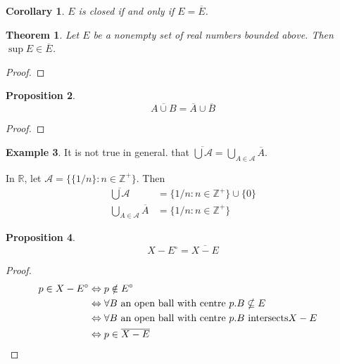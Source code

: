 \documentclass{book}
\let\qed\relax
\newtheorem{prop}{Proposition}[chapter]
\newtheorem{cor}{Corollary}[prop]
\newtheorem{thm}[prop]{Theorem}
\theoremstyle{definition}
\newtheorem{ex}[prop]{Example}
\begin{document}
\begin{cor}
$E$ is closed if and only if $E = \overline{E}$.
\end{cor}

\begin{thm}
Let $E$ be a nonempty set of real numbers bounded above. Then $\sup E \in \overline{E}$.
\end{thm}

\begin{proof}
\pf
{}
\qed
\end{proof}

\begin{prop}
\[ \overline{A \cup B} = \overline{A} \cup \overline{B} \]
\end{prop}

\begin{proof}
\pf
{}
\qed
\end{proof}

\begin{ex}
It is not true in general. that $\overline{\bigcup \mathcal{A}} = \bigcup_{A \in \mathcal{A}} \overline{A}$.

In $\mathbb{R}$, let $\mathcal{A} = \{ \{ 1/n \} : n \in \mathbb{Z}^+ \}$. Then
\begin{align*}
\overline{\bigcup \mathcal{A}} & = \{ 1/n : n \in \mathbb{Z}^+ \} \cup \{ 0 \} \\
\bigcup_{A \in \mathcal{A}} \overline{A} & = \{ 1/n : n \in \mathbb{Z}^+ \}
\end{align*}
\end{ex}

\begin{prop}
\[ X - E^\circ = \overline{X - E} \]
\end{prop}

\begin{proof}
\pf
\begin{align*}
p \in X - E^\circ & \Leftrightarrow p \notin E^\circ \\
& \Leftrightarrow \forall B \text{ an open ball with centre } p. B \nsubseteq E \\
& \Leftrightarrow \forall B \text{ an open ball with centre } p. B \text{ intersects} X - E \\
& \Leftrightarrow p \in \overline{X - E} & \qed
\end{align*}
\end{proof}
\end{document}
